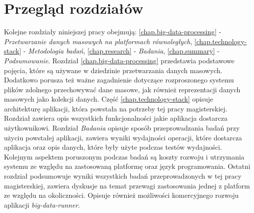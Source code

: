 \section{Przegląd rozdziałów}
Kolejne rozdziały niniejszej pracy obejmują: \ref{chap.big-data-processing} - \textit{Przetwarzanie danych masowych na platformach równoległych}, \ref{chap.technology-stack} - \textit{Metodologia badań}, \ref{chap.research} - \textit{Badania}, \ref{chap.summary} - \textit{Podsumowanie}. Rozdział \ref{chap.big-data-processing} przedstawia podstawowe pojęcia, które są używane w dziedzinie przetwarzania danych masowych. Dodatkowo porusza też ważne zagadnienie dotyczące rozproszonego systemu plików zdolnego przechowywać dane masowe, jak również reprezentacji danych masowych jako kolekcji danych. Część \ref{chap.technology-stack} opisuje architekturę aplikacji, która powstała na potrzeby tej pracy magisterskiej. Rozdział zawiera opis wszystkich funkcjonalności jakie aplikacja dostarcza użytkownikowi. Rozdział \textit{Badania} opisuje sposób przeprowadzania badań przy użyciu powstałej aplikacji, zawiera wyniki wydajności operacji, które dostarcza aplikacja oraz opis danych, które były użyte podczas testów wydajności. Kolejnym aspektem poruszonym podczas badań są koszty rozwoju i utrzymania systemu ze względu na zastosowaną platformę oraz język programowania. Ostatni rozdział podsumowuje wyniki wszystkich badań przeprowadzonych w tej pracy magisterskiej, zawiera dyskusje na temat przewagi zastosowania jednej z platform ze względu na okoliczności. Opisuje również możliwości komercyjnego rozwoju aplikacji \textit{big-data-runner}.
